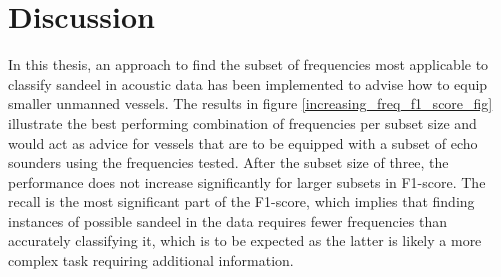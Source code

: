 \chapter{Discussion}
    
    In this thesis, an approach to find the subset of frequencies most applicable to classify sandeel in acoustic data has been implemented to advise how to equip smaller unmanned vessels. The results in figure  \ref{increasing_freq_f1_score_fig} illustrate the best performing combination of frequencies per subset size and would act as advice for vessels that are to be equipped  with a subset of echo sounders using the frequencies tested. After the subset size of three, the performance does not increase significantly for larger subsets in F1-score. The recall is the most significant part of the F1-score, which implies that finding instances of possible sandeel in the data requires fewer frequencies than accurately classifying it, which is to be expected as the latter is likely a more complex task requiring additional information. 
    
    
    


